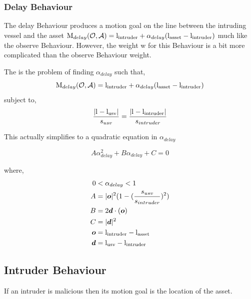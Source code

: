 \documentclass[bsc,frontabs,twoside,singlespacing,parskip,deptreport]{infthesis}     %
\begin{document}
\subsubsection{Delay Behaviour}
\label{ss:beh:delay}
The delay Behaviour produces a motion goal on the line between the intruding vessel and the asset $\mathrm{M}_{delay}(\mathcal{O}, \mathcal{A}) = \mathrm{l_{intruder}} + \alpha_{delay}(\mathrm{l_{asset}}-\mathrm{l_{intruder}})$ much like the observe Behaviour. However, the weight w for this Behaviour is a bit more complicated than the observe Behaviour weight. 

The is the problem of finding $\alpha_{delay}$ such that,
    $$\mathrm{M}_{delay}(\mathcal{O}, \mathcal{A}) = \mathrm{l_{intruder}} + \alpha_{delay}(\mathrm{l_{asset}}-\mathrm{l_{intruder}})$$
subject to,
    $$\frac{|\mathrm{l_{}}-\mathrm{l_{usv}}|}{s_{usv}} = \frac{|\mathrm{l_{}}-\mathrm{l_{intruder}}|}{s_{intruder}}$$

This actually simplifies to a quadratic equation in $\alpha_{delay}$ 

    $$A\alpha_{delay}^2 + B\alpha_{delay} + C=0$$

where,
\begin{align*}
    0 &< \alpha_{delay} < 1 \\
    A &= |\boldsymbol{o}|^2(1-(\frac{s_{usv}}{s_{intruder}})^2)\\
    B &= 2\boldsymbol{d}\cdot(\boldsymbol{o})\\
    C &= |\boldsymbol{d}|^2\\
    \boldsymbol{o} &= \mathrm{l_{intruder}}-\mathrm{l_{asset}}\\
    \boldsymbol{d} &= \mathrm{l_{usv}}-\mathrm{l_{intruder}}
\end{align*}


\subsection{Intruder Behaviour}
\label{sub:beh:intruder}

If an intruder is malicious then its motion goal is the location of the asset. 
\end{document}
